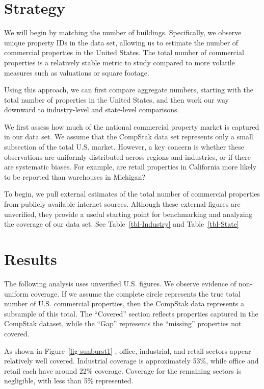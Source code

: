 \documentclass[
  12pt]{article}
\begin{document}
\section{Strategy}\label{strategy}

We will begin by matching the number of buildings. Specifically, we
observe unique property IDs in the data set, allowing us to estimate the
number of commercial properties in the United States. The total number
of commercial properties is a relatively stable metric to study compared
to more volatile measures such as valuations or square footage.

Using this approach, we can first compare aggregate numbers, starting
with the total number of properties in the United States, and then work
our way downward to industry-level and state-level comparisons.

We first assess how much of the national commercial property market is
captured in our data set. We assume that the CompStak data set
represents only a small subsection of the total U.S. market. However, a
key concern is whether these observations are uniformly distributed
across regions and industries, or if there are systematic biases. For
example, are retail properties in California more likely to be reported
than warehouses in Michigan?

To begin, we pull external estimates of the total number of commercial
properties from publicly available internet sources. Although these
external figures are unverified, they provide a useful starting point
for benchmarking and analyzing the coverage of our data set. See
Table~\ref{tbl-Industry} and Table~\ref{tbl-State}

\section{Results}\label{results}

The following analysis uses unverified U.S. figures. We observe evidence
of non-uniform coverage. If we assume the complete circle represents the
true total number of U.S. commercial properties, then the CompStak data
represents a subsample of this total. The ``Covered'' section reflects
properties captured in the CompStak dataset, while the ``Gap''
represents the ``missing'' properties not covered.

As shown in Figure~\ref{fig-sunburst1} , office, industrial, and retail
sectors appear relatively well covered. Industrial coverage is
approximately 53\%, while office and retail each have around 22\%
coverage. Coverage for the remaining sectors is negligible, with less
than 5\% represented.
\end{document}
